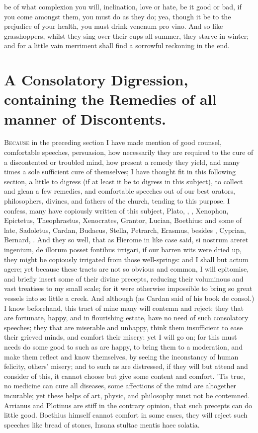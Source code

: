 {be of what complexion you will, inclination, love or hate, be it good
or bad, if you come amongst them, you must do as they do; yea,
though it be to the prejudice of your health, you must drink
venenum pro vino. And so like grasshoppers, whilst they sing over their
cups all summer, they starve in winter; and for a little vain merriment
shall find a sorrowful reckoning in the end.



\section[A Consolatory Digression]{A Consolatory Digression, containing the Remedies of all manner of Discontents.}

\lettrine{B}{ecause} in the preceding section I have made mention of good counsel,
comfortable speeches, persuasion, how necessarily they are required to
the cure of a discontented or troubled mind, how present a remedy they
yield, and many times a sole sufficient cure of themselves; I have
thought fit in this following section, a little to digress (if at least
it be to digress in this subject), to collect and glean a few remedies,
and comfortable speeches out of our best orators, philosophers,
divines, and fathers of the church, tending to this purpose. I confess,
many have copiously written of this subject, Plato, \Seneca, \Plutarch,
Xenophon, Epictetus, Theophrastus, Xenocrates, Grantor, Lucian,
Boethius: and some of late, Sadoletus, Cardan, Budaeus, Stella,
Petrarch, Erasmus, besides \Austin{}, Cyprian, Bernard, \etc{}. And they so
well, that as Hierome in like case said, si nostrum areret ingenium, de
illorum posset fontibus irrigari, if our barren wits were dried up,
they might be copiously irrigated from those well-springs: and I shall
but actum agere; yet because these tracts are not so obvious and
common, I will epitomise, and briefly insert some of their divine
precepts, reducing their voluminous and vast treatises to my small
scale; for it were otherwise impossible to bring so great vessels into
so little a creek. And although (as Cardan said of his book de consol.)
I know beforehand, this tract of mine many will contemn and
reject; they that are fortunate, happy, and in flourishing estate, have
no need of such consolatory speeches; they that are miserable and
unhappy, think them insufficient to ease their grieved minds, and
comfort their misery: yet I will go on; for this must needs do some
good to such as are happy, to bring them to a moderation, and make them
reflect and know themselves, by seeing the inconstancy of human
felicity, others' misery; and to such as are distressed, if they will
but attend and consider of this, it cannot choose but give some content
and comfort. 'Tis true, no medicine can cure all diseases, some
affections of the mind are altogether incurable; yet these helps of
art, physic, and philosophy must not be contemned. Arrianus and
Plotinus are stiff in the contrary opinion, that such precepts can do
little good. Boethius himself cannot comfort in some cases, they will
reject such speeches like bread of stones, Insana stultae mentis haec
solatia. 

}
